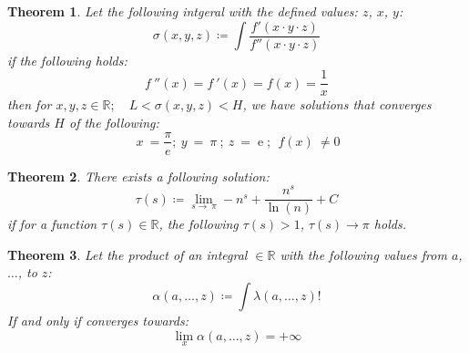 \documentclass[10pt, twocolumn]{article}
\theoremstyle{plain}
\newtheorem{theorem}{Theorem}[section]
\theoremstyle{definition}
\theoremstyle{remark}
\begin{document}
\begin{theorem}
  Let the following intgeral with the defined values: $z$, $x$, $y$:
  \begin{equation}
    \sigma(x, y, z) \coloneq \int \frac{f'(x \cdot y \cdot z)}{f''(x \cdot y \cdot z)}
  \end{equation}
  if the following holds:
  \begin{equation}
    f\:''\left(x\right)= f\:'\left(x\right)=f\left(x\right)=\frac{1}{x}
  \end{equation}
  then for $x, y, z \in \mathbb{R}; \quad L < \sigma(x, y, z) < H$, we have solutions that converges towards $H$ of the following:
  \begin{equation}
    \:x\:=\frac{\pi}{e};\:y\:=\:\pi \:;\:z\:= \operatorname{e};\:\:f\left(x\right)\:\ne 0
  \end{equation}
\end{theorem}

\begin{theorem}
  There exists a following solution:
  \begin{equation}
    \tau (s) \coloneq \lim _{s\to \:\pi } -n^s+\frac{n^s}{\ln \left(n\right)}+C
  \end{equation}
  if for a function $\tau (s) \in \mathbb{R}$, the following $\tau (s) > 1$, $\tau (s) \to \pi$ holds.
\end{theorem}

\begin{theorem}
  Let the product of an integral $\in \mathbb{R}$ with the following values from $a$, $\dots$, to $z$:
  \begin{equation}
    \alpha(a, \dots, z) \coloneq \int \lambda(a, \dots, z)! 
  \end{equation}
  If and only if converges towards:
  \begin{equation}
    \lim_{x} \alpha(a, \dots, z) = +\infty
  \end{equation}
\end{theorem}
\end{document}

